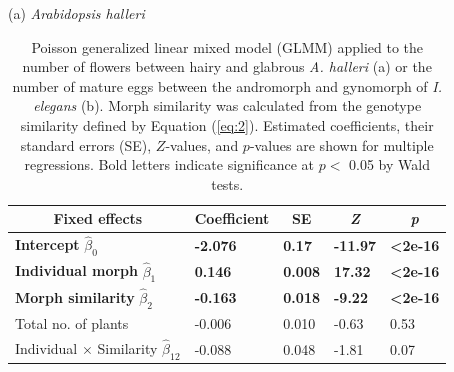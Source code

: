 \documentclass[12pt,]{article}
\begin{document}
\begin{table}[ht]
\caption{Poisson generalized linear mixed model (GLMM) applied to the number of flowers between hairy and glabrous \textit{A. halleri} (a) or the number of mature eggs between the andromorph and gynomorph of \textit{I. elegans} (b). Morph similarity was calculated from the genotype similarity defined by Equation (\ref{eq:2}). Estimated coefficients, their standard errors (SE), $Z$-values, and $p$-values are shown for multiple regressions. Bold letters indicate significance at $p <$ 0.05 by Wald tests.}
(a) \textit{Arabidopsis halleri} \\
\begin{tabular}{lllll}
\hline
\multicolumn{1}{c}{Fixed effects} & \multicolumn{1}{c}{Coefficient} & \multicolumn{1}{c}{SE} & \multicolumn{1}{c}{\textit{Z}} & \multicolumn{1}{c}{\textit{p}} \\ \hline
\textbf{Intercept} $\hat{\beta}_{0}$    & \textbf{-2.076}  &  \textbf{0.17} & \textbf{-11.97} & \textbf{\textless{}2e-16}  \\
\textbf{Individual morph} $\hat{\beta}_{1}$      & \textbf{0.146}                  & \textbf{0.008}         & \textbf{17.32}                 & \textbf{\textless{}2e-16}      \\
\textbf{Morph similarity} $\hat{\beta}_{2}$        & \textbf{-0.163}                 & \textbf{0.018}         & \textbf{-9.22}                 & \textbf{\textless{}2e-16}      \\
Total no. of plants               & -0.006                          & 0.010                  & -0.63                          & 0.53                           \\
Individual $\times$ Similarity $\hat{\beta}_{12}$            & -0.088                          & 0.048                  & -1.81                          & 0.07                           \\ \hline
\end{tabular}

\vspace*{5mm}


\end{table}
\end{document}
